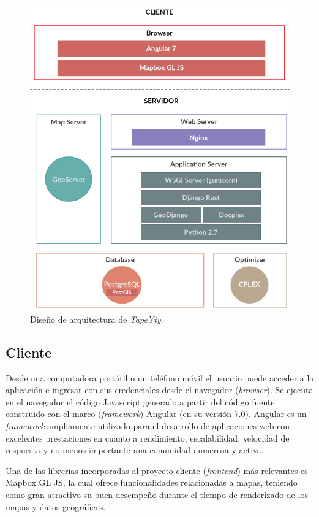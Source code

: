 \begin{figure}[bp]
\centerline{\includegraphics[width=\textwidth]{20190424_WebAppArchitectureDesign.png}}
\caption{Diseño de arquitectura de \textit{TapeYty}.}
\label{fig:disenhoArquitectura}
\end{figure}

\subsection{Cliente}

Desde una computadora portátil o un teléfono móvil el usuario puede acceder a la aplicación e ingresar con sus credenciales desde el navegador (\textit{browser}). Se ejecuta en el navegador el código Javascript generado a partir del código fuente construido con el marco (\textit{framework}) Angular (en su versión 7.0). Angular es un \textit{framework} ampliamente utilizado para el desarrollo de aplicaciones web con excelentes prestaciones en cuanto a rendimiento, escalabilidad, velocidad de respuesta y no menos importante una comunidad numerosa y activa. 

Una de las librerías incorporadas al proyecto cliente (\textit{frontend}) más relevantes es Mapbox GL JS, la cual ofrece funcionalidades relacionadas a mapas, teniendo como gran atractivo su buen desempeño durante el tiempo de renderizado de los mapas y datos geográficos.

